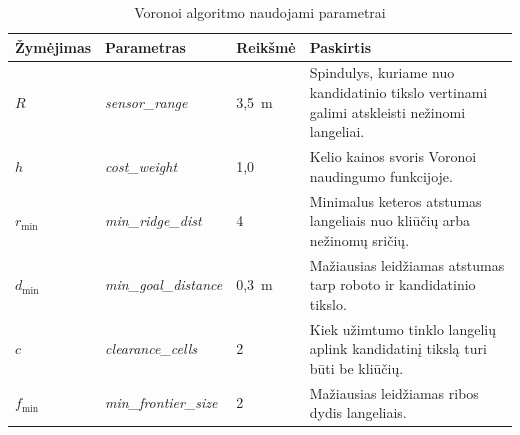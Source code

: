 \documentclass[]{VUMIFTemplateClass}
\begin{document}
\begin{table}[H]
\centering
\caption{Voronoi algoritmo naudojami parametrai}
\label{tab:voronoi-pseudocode-params}
\small
\begin{tabular}{|p{1.8cm}|p{3.8cm}|p{2.1cm}|p{6.2cm}|}
\hline
\textbf{Žymėjimas} & \textbf{Parametras} & \textbf{Reikšmė} & \textbf{Paskirtis} \\
\hline
$R$ & \textit{sensor\_range} & 3,5~m & Spindulys, kuriame nuo kandidatinio tikslo vertinami galimi atskleisti nežinomi langeliai. \\
\hline
$h$ & \textit{cost\_weight} & 1,0 & Kelio kainos svoris Voronoi naudingumo funkcijoje. \\
\hline
$r_{\min}$ & \textit{min\_ridge\_dist} & 4 & Minimalus keteros atstumas langeliais nuo kliūčių arba nežinomų sričių. \\
\hline
$d_{\min}$ & \textit{min\_goal\_distance} & 0,3~m & Mažiausias leidžiamas atstumas tarp roboto ir kandidatinio tikslo. \\
\hline
$c$ & \textit{clearance\_cells} & 2 & Kiek užimtumo tinklo langelių aplink kandidatinį tikslą turi būti be kliūčių. \\
\hline
$f_{\min}$ & \textit{min\_frontier\_size} & 2 & Mažiausias leidžiamas ribos dydis langeliais. \\
\hline
\end{tabular}
\end{table}
\end{document}
